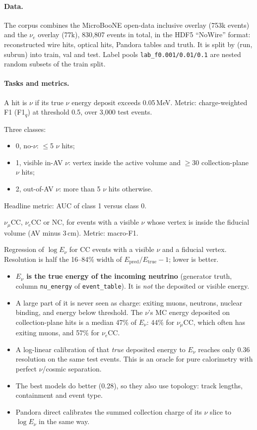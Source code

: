 \documentclass[11pt,a4paper]{article}
\newcommand{\nue}{\ensuremath{\nu_e}}
\newcommand{\numu}{\ensuremath{\nu_\mu}}
\newcommand{\code}[1]{\texttt{\small #1}}
\begin{document}
\paragraph{Data.} The corpus combines the MicroBooNE open-data inclusive overlay (753k events) and the \nue{} overlay (77k), 830{,}807 events in total, in the HDF5 ``NoWire'' format: reconstructed wire hits, optical hits, Pandora tables and truth. It is split by (run, subrun) into train, val and test. Label pools \code{lab\_f0.001/0.01/0.1} are nested random subsets of the train split.

\paragraph{Tasks and metrics.}
\begin{description}[leftmargin=1.2em]
\item[T1 hit $\nu$/cosmic.] A hit is $\nu$ if its true $\nu$ energy deposit exceeds 0.05\,MeV. Metric: charge-weighted F1 (F1$_q$) at threshold 0.5, over 3{,}000 test events.
\item[T2 event $\nu$ presence.] Three classes:
  \begin{itemize}
    \item 0, no-$\nu$: $\leq$5 $\nu$ hits;
    \item 1, visible in-AV $\nu$: vertex inside the active volume and $\geq$30 collection-plane $\nu$ hits;
    \item 2, out-of-AV $\nu$: more than 5 $\nu$ hits otherwise.
  \end{itemize}
  Headline metric: AUC of class 1 versus class 0.
\item[T3 flavor.] \numu CC, \nue CC or NC, for events with a visible $\nu$ whose vertex is inside the fiducial volume (AV minus 3\,cm). Metric: macro-F1.
\item[T4 energy.] Regression of $\log E_\nu$ for CC events with a visible $\nu$ and a fiducial vertex. Resolution is half the 16--84\% width of $E_\text{pred}/E_\text{true}-1$; lower is better.
\begin{itemize}
  \item \textbf{$E_\nu$ is the true energy of the incoming neutrino} (generator truth, column \code{nu\_energy} of \code{event\_table}). It is \emph{not} the deposited or visible energy.
  \item A large part of it is never seen as charge: exiting muons, neutrons, nuclear binding, and energy below threshold. The $\nu$'s MC energy deposited on collection-plane hits is a median 47\% of $E_\nu$: 44\% for \numu CC, which often has exiting muons, and 57\% for \nue CC.
  \item A log-linear calibration of that \emph{true} deposited energy to $E_\nu$ reaches only 0.36 resolution on the same test events. This is an oracle for pure calorimetry with perfect $\nu$/cosmic separation.
  \item The best models do better (0.28), so they also use topology: track lengths, containment and event type.
  \item Pandora direct calibrates the summed collection charge of its $\nu$ slice to $\log E_\nu$ in the same way.
\end{itemize}
\end{description}
\end{document}
